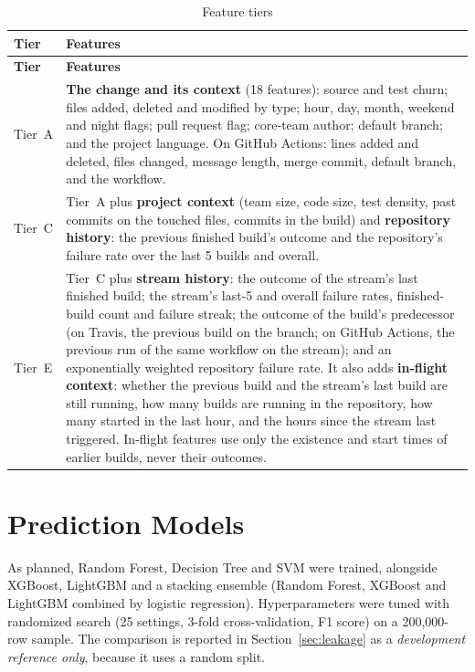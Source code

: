 {\renewcommand{\arraystretch}{1.3}
\begin{longtable}{|p{1.6cm}|p{12.2cm}|}
\caption{Feature tiers}\label{tab:tiers}\\
\hline
\textbf{Tier} & \textbf{Features}\\ \hline
\endfirsthead
\hline
\textbf{Tier} & \textbf{Features}\\ \hline
\endhead
Tier~A & \textbf{The change and its context} (18 features): source and test churn; files added, deleted and modified by type; hour, day, month, weekend and night flags; pull request flag; core-team author; default branch; and the project language. On GitHub Actions: lines added and deleted, files changed, message length, merge commit, default branch, and the workflow.\\ \hline
Tier~C & Tier~A plus \textbf{project context} (team size, code size, test density, past commits on the touched files, commits in the build) and \textbf{repository history}: the previous finished build's outcome and the repository's failure rate over the last 5 builds and overall.\\ \hline
Tier~E & Tier~C plus \textbf{stream history}: the outcome of the stream's last finished build; the stream's last-5 and overall failure rates, finished-build count and failure streak; the outcome of the build's predecessor (on Travis, the previous build on the branch; on GitHub Actions, the previous run of the same workflow on the stream); and an exponentially weighted repository failure rate.\newline
It also adds \textbf{in-flight context}: whether the previous build and the stream's last build are still running, how many builds are running in the repository, how many started in the last hour, and the hours since the stream last triggered. In-flight features use only the existence and start times of earlier builds, never their outcomes.\\ \hline
\end{longtable}}

\section{Prediction Models}
\label{sec:models}
As planned, Random Forest, Decision Tree and SVM were trained, alongside XGBoost, LightGBM and a stacking ensemble (Random Forest, XGBoost and LightGBM combined by logistic regression). Hyperparameters were tuned with randomized search (25 settings, 3-fold cross-validation, F1 score) on a 200,000-row sample. The comparison is reported in Section~\ref{sec:leakage} as a \emph{development reference only}, because it uses a random split.

